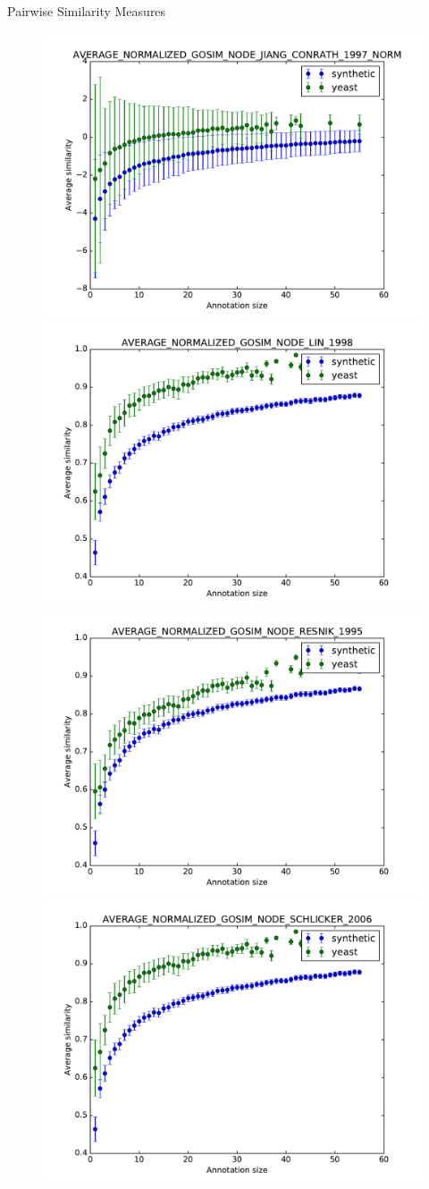 \documentclass{beamer}
\begin{document}

\begin{frame}{Pairwise Similarity Measures}

\begin{figure}
\includegraphics[width=0.5\linewidth, height=0.4\textheight]{pairwise/SIM_GROUPWISE_AVERAGE_NORMALIZED_GOSIM_SIM_PAIRWISE_DAG_NODE_JIANG_CONRATH_1997_NORM_avg.pdf}
\includegraphics[width=0.5\linewidth, height=0.4\textheight]{pairwise/SIM_GROUPWISE_AVERAGE_NORMALIZED_GOSIM_SIM_PAIRWISE_DAG_NODE_LIN_1998_avg.pdf} \\
\includegraphics[width=0.5\linewidth, height=0.4\textheight]{pairwise/SIM_GROUPWISE_AVERAGE_NORMALIZED_GOSIM_SIM_PAIRWISE_DAG_NODE_RESNIK_1995_avg.pdf}
\includegraphics[width=0.5\linewidth, height=0.4\textheight]{pairwise/SIM_GROUPWISE_AVERAGE_NORMALIZED_GOSIM_SIM_PAIRWISE_DAG_NODE_SCHLICKER_2006_avg.pdf}
\end{figure}

\end{frame}
\end{document}
